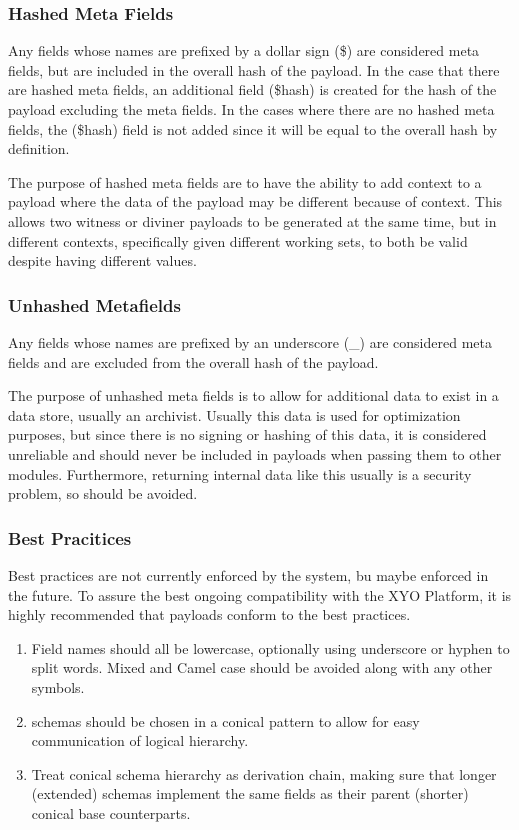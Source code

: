 \documentclass{article}
\begin{document}
\subsubsection{Hashed Meta Fields}
Any fields whose names are prefixed by a dollar sign (\$) are considered meta fields, but are included in the overall hash of the payload.
In the case that there are hashed meta fields, an additional field (\$hash) is created for the hash of the payload excluding the meta fields.
In the cases where there are no hashed meta fields, the (\$hash) field is not added since it will be equal to the overall hash by definition.

The purpose of hashed meta fields are to have the ability to add context to a payload where the data of the payload may be different because of context.  This allows two witness or diviner payloads to be generated at the same time, but in different contexts, specifically given different working sets, to both be valid despite having different values.

\subsubsection{Unhashed Metafields}
Any fields whose names are prefixed by an underscore (\_) are considered meta fields and are excluded from the overall hash of the payload.

The purpose of unhashed meta fields is to allow for additional data to exist in a data store, usually an archivist.  Usually this data is used for optimization purposes, but since there is no signing or hashing of this data, it is considered unreliable and should never be included in payloads when passing them to other modules.  Furthermore, returning internal data like this usually is a security problem, so should be avoided.

\subsubsection{Best Pracitices}
Best practices are not currently enforced by the system, bu maybe enforced in the future.  To assure the best ongoing compatibility with the XYO Platform, it is highly recommended that payloads conform to the best practices.
\begin{enumerate}
    \item Field names should all be lowercase, optionally using underscore or hyphen to split words.  Mixed and Camel case should be avoided along with any other symbols.
    \item schemas should be chosen in a conical pattern to allow for easy communication of logical hierarchy.
    \item Treat conical schema hierarchy as derivation chain, making sure that longer (extended) schemas implement the same fields as their parent (shorter) conical base counterparts.
\end{enumerate}
\end{document}
